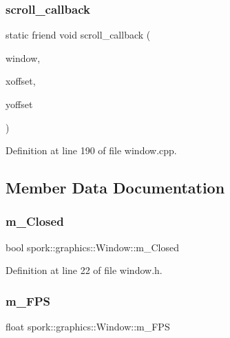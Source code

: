 \subsubsection{\texorpdfstring{scroll\+\_\+callback}{scroll\_callback}}
{\footnotesize\ttfamily static friend void scroll\+\_\+callback (\begin{DoxyParamCaption}\item[{G\+L\+F\+Wwindow $\ast$}]{window,  }\item[{double}]{xoffset,  }\item[{double}]{yoffset }\end{DoxyParamCaption})\hspace{0.3cm}{\ttfamily [friend]}}



Definition at line 190 of file window.\+cpp.



\subsection{Member Data Documentation}
\mbox{\label{classspork_1_1graphics_1_1_window_aa639e1215ea2ee6304771668bf8b8645}} 
\subsubsection{\texorpdfstring{m\+\_\+\+Closed}{m\_Closed}}
{\footnotesize\ttfamily bool spork\+::graphics\+::\+Window\+::m\+\_\+\+Closed\hspace{0.3cm}{\ttfamily [private]}}



Definition at line 22 of file window.\+h.

\mbox{\label{classspork_1_1graphics_1_1_window_a801e3f961f859f6e9e9aa23487640c9e}} 
\subsubsection{\texorpdfstring{m\+\_\+\+F\+PS}{m\_FPS}}
{\footnotesize\ttfamily float spork\+::graphics\+::\+Window\+::m\+\_\+\+F\+PS\hspace{0.3cm}{\ttfamily [private]}}



